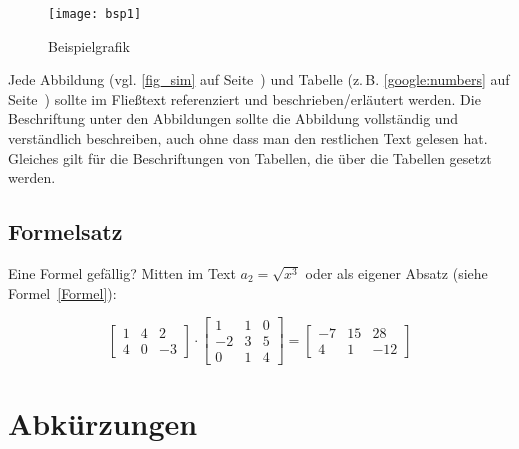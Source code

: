 \documentclass[conference,compsoc,final,a4paper]{IEEEtran}
\begin{document}
\begin{figure}[!ht]
\centering
\texttt{[image: bsp1]}
\caption{Beispielgrafik~\cite{Dean2012}}
\label{fig_sim}
\end{figure}

Jede Abbildung (vgl. \autoref{fig_sim} auf Seite~\pageref{fig_sim}) und Tabelle (z.\,B. \autoref{google:numbers} auf Seite~\pageref{google:numbers}) sollte im Fließtext referenziert und beschrieben/erläutert werden. Die Beschriftung unter den Abbildungen sollte die Abbildung vollständig und verständlich beschreiben, auch ohne dass man den restlichen Text gelesen hat. Gleiches gilt für die Beschriftungen von Tabellen, die über die Tabellen gesetzt werden.

\subsection{Formelsatz}
Eine Formel gefällig? Mitten im Text $a_2 = \sqrt{x^3}$ oder als eigener Absatz (siehe Formel~\ref{Formel}):

\begin{equation}
\begin{bmatrix}
   1 &  4 &  2 \\
   4 &  0 & -3
\end{bmatrix}
        \cdot
\begin{bmatrix}
   1 &  1 &  0 \\
  -2 &  3 &  5 \\
   0 &  1 &  4
\end{bmatrix}
       {=}
\begin{bmatrix}
  -7 &  15 &  28 \\
   4 &   1 & -12
\end{bmatrix}
\label{Formel}
\end{equation}

\section*{Abkürzungen}

\begin{acronym}[IEEE]
\end{acronym}

\printbibliography
\end{document}
